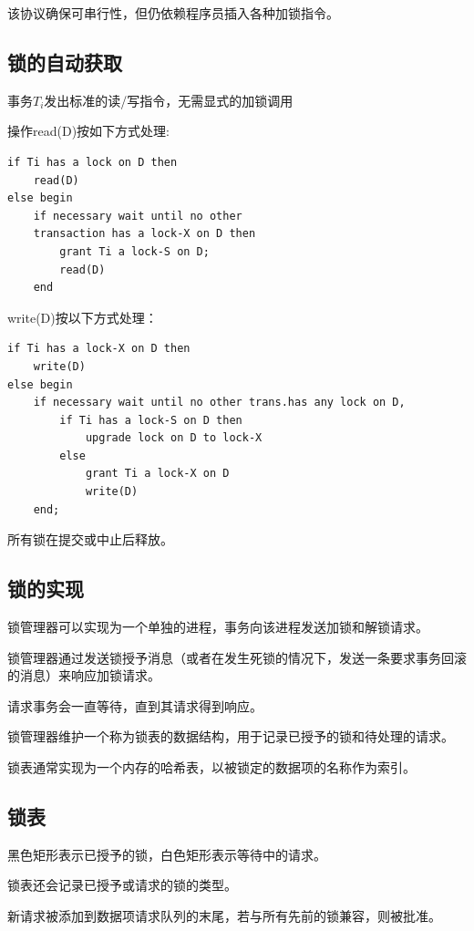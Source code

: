 该协议确保可串行性，但仍依赖程序员插入各种加锁指令。

\subsection{锁的自动获取}

事务$T_i$发出标准的读/写指令，无需显式的加锁调用

\noindent 操作read(D)按如下方式处理:
\begin{lstlisting}[style=sqlstyle]
if Ti has a lock on D then
    read(D)
else begin
    if necessary wait until no other
    transaction has a lock-X on D then
        grant Ti a lock-S on D;
        read(D)
    end    
\end{lstlisting}

\noindent write(D)按以下方式处理：
\begin{lstlisting}[style=sqlstyle]
if Ti has a lock-X on D then
    write(D)
else begin
    if necessary wait until no other trans.has any lock on D,
        if Ti has a lock-S on D then
            upgrade lock on D to lock-X
        else 
            grant Ti a lock-X on D
            write(D)
    end;    
\end{lstlisting}

所有锁在提交或中止后释放。

\subsection{锁的实现}

锁管理器可以实现为一个单独的进程，事务向该进程发送加锁和解锁请求。

锁管理器通过发送锁授予消息（或者在发生死锁的情况下，发送一条要求事务回滚的消息）来响应加锁请求。

请求事务会一直等待，直到其请求得到响应。

锁管理器维护一个称为锁表的数据结构，用于记录已授予的锁和待处理的请求。

锁表通常实现为一个内存的哈希表，以被锁定的数据项的名称作为索引。

\subsection{锁表}

黑色矩形表示已授予的锁，白色矩形表示等待中的请求。

锁表还会记录已授予或请求的锁的类型。

新请求被添加到数据项请求队列的末尾，若与所有先前的锁兼容，则被批准。

